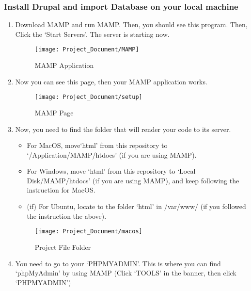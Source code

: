 \documentclass[10pt]{article}
\begin{document}
        \subsubsection{Install Drupal and import Database on your local machine} 
            \begin{enumerate}
                \item Download MAMP and run MAMP. Then, you should see this program. Then, Click the `Start Servers’. The server is starting now.

                    \begin{figure}[!ht]
                        \centering
                        \texttt{[image: Project\_Document/MAMP]}
                        \caption{MAMP Application}
                    \end{figure}
\newpage            
                \item Now you can see this page, then your MAMP application works. 
           
                    \begin{figure}[!ht]
                        \centering
                        \texttt{[image: Project\_Document/setup]}
                        \caption{MAMP Page}
                    \end{figure}      
            
                \item Now, you need to find the folder that will render your code to its server.

                    \begin{itemize}
                        \item For MacOS, move`html' from this repository to `/Application/MAMP/htdocs' (if you are using MAMP).
                        \item For Windows, move `html' from this repository to `Local Disk/MAMP/htdocs' (if you are using MAMP), and keep following the instruction for MacOS.
                        \item (if) For Ubuntu, locate to the folder `html' in /var/www/ (if you followed the instruction the above). 
                    \end{itemize}

                    \begin{figure}[!ht]
                           \centering
                           \texttt{[image: Project\_Document/macos]}
                        \caption{Project File Folder}
                    \end{figure}  
\newpage                    
                \item You need to go to your `PHPMYADMIN’. This is where you can find `phpMyAdmin' by using MAMP (Click `TOOLS' in the banner, then click `PHPMYADMIN')
 

\end{enumerate}
\end{document}
